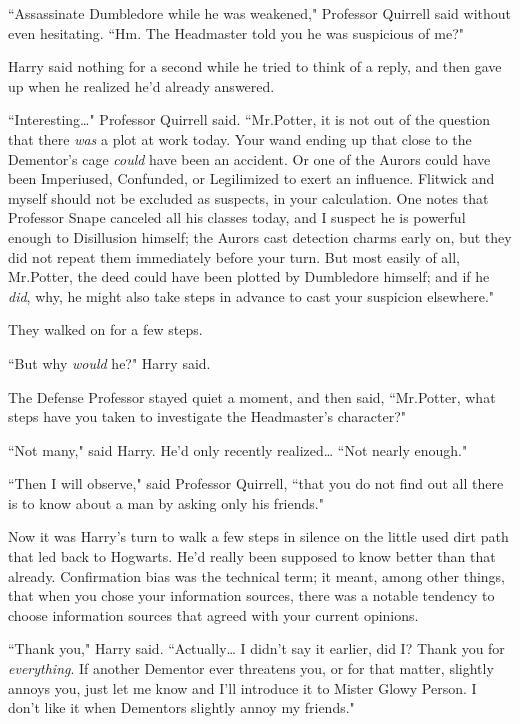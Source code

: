 ``Assassinate Dumbledore while he was weakened," Professor Quirrell said without even hesitating. ``Hm. The Headmaster told you he was suspicious of me?"

Harry said nothing for a second while he tried to think of a reply, and then gave up when he realized he'd already answered.

``Interesting{\ldots}" Professor Quirrell said. ``Mr.\?Potter, it is not out of the question that there \emph{was} a plot at work today. Your wand ending up that close to the Dementor's cage \emph{could} have been an accident. Or one of the Aurors could have been Imperiused, Confunded, or Legilimized to exert an influence. Flitwick and myself should not be excluded as suspects, in your calculation. One notes that Professor Snape canceled all his classes today, and I suspect he is powerful enough to Disillusion himself; the Aurors cast detection charms early on, but they did not repeat them immediately before your turn. But most easily of all, Mr.\?Potter, the deed could have been plotted by Dumbledore himself; and if he \emph{did}, why, he might also take steps in advance to cast your suspicion elsewhere."

They walked on for a few steps.

``But why \emph{would} he?" Harry said.

The Defense Professor stayed quiet a moment, and then said, ``Mr.\?Potter, what steps have you taken to investigate the Headmaster's character?"

``Not many," said Harry. He'd only recently realized{\ldots} ``Not nearly enough."

``Then I will observe," said Professor Quirrell, ``that you do not find out all there is to know about a man by asking only his friends."

Now it was Harry's turn to walk a few steps in silence on the little used dirt path that led back to Hogwarts. He'd really been supposed to know better than that already. Confirmation bias was the technical term; it meant, among other things, that when you chose your information sources, there was a notable tendency to choose information sources that agreed with your current opinions.

``Thank you," Harry said. ``Actually{\ldots} I didn't say it earlier, did I? Thank you for \emph{everything}. If another Dementor ever threatens you, or for that matter, slightly annoys you, just let me know and I'll introduce it to Mister Glowy Person. I don't like it when Dementors slightly annoy my friends."

